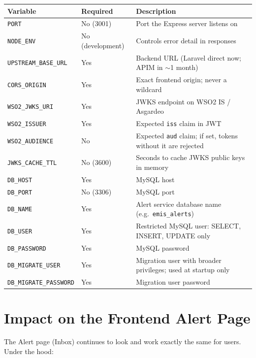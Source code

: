 \documentclass[11pt]{article}
\begin{document}
\begin{table}[h]
\small
\begin{tabularx}{\textwidth}{l l X}
\toprule
\textbf{Variable} & \textbf{Required} & \textbf{Description} \\
\midrule
\texttt{PORT} & No (3001) & Port the Express server listens on \\
\texttt{NODE\_ENV} & No (development) & Controls error detail in responses \\
\texttt{UPSTREAM\_BASE\_URL} & Yes & Backend URL (Laravel direct now; APIM in $\sim$1 month) \\
\texttt{CORS\_ORIGIN} & Yes & Exact frontend origin; never a wildcard \\
\texttt{WSO2\_JWKS\_URI} & Yes & JWKS endpoint on WSO2 IS / Asgardeo \\
\texttt{WSO2\_ISSUER} & Yes & Expected \texttt{iss} claim in JWT \\
\texttt{WSO2\_AUDIENCE} & No & Expected \texttt{aud} claim; if set, tokens without it are rejected \\
\texttt{JWKS\_CACHE\_TTL} & No (3600) & Seconds to cache JWKS public keys in memory \\
\texttt{DB\_HOST} & Yes & MySQL host \\
\texttt{DB\_PORT} & No (3306) & MySQL port \\
\texttt{DB\_NAME} & Yes & Alert service database name (e.g.\ \texttt{emis\_alerts}) \\
\texttt{DB\_USER} & Yes & Restricted MySQL user: SELECT, INSERT, UPDATE only \\
\texttt{DB\_PASSWORD} & Yes & MySQL password \\
\texttt{DB\_MIGRATE\_USER} & Yes & Migration user with broader privileges; used at startup only \\
\texttt{DB\_MIGRATE\_PASSWORD} & Yes & Migration user password \\
\bottomrule
\end{tabularx}
\end{table}

\section{Impact on the Frontend Alert Page}

The Alert page (Inbox) continues to look and work exactly the same for users. Under the hood:
\end{document}
